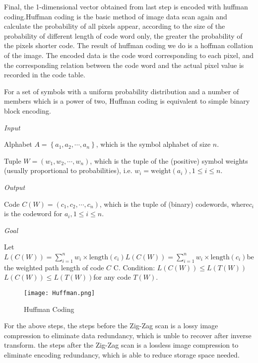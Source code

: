 \documentclass{mcmthesis}
\begin{document}
Final, the 1-dimensional vector obtained from last step is encoded with huffman coding.Huffman coding is the basic method of image data scan again and calculate the probability of all pixels appear, according to the size of the probability of different length of code word only, the greater the probability of the pixels shorter code. The result of huffman coding we do is a hoffman collation of the image. The encoded data is the code word corresponding to each pixel, and the corresponding relation between the code word and the actual pixel value is recorded in the code table.

For a set of symbols with a uniform probability distribution and a number of members which is a power of two, Huffman coding is equivalent to simple binary block encoding.

\emph{Input}

Alphabet  ${\displaystyle A=\left\{a_{1},a_{2},\cdots ,a_{n}\right\}}$, which is the symbol alphabet of size ${\displaystyle n}$.

Tuple ${\displaystyle W=(w_{1},w_{2},\cdots ,w_{n})}$, which is the tuple of the (positive) symbol weights (usually proportional to probabilities), i.e. ${\displaystyle w_{i}=\mathrm {weight} \left(a_{i}\right),1\leq i\leq n}$.

\emph{Output}

Code ${\displaystyle C\left(W\right)=(c_{1},c_{2},\cdots ,c_{n})}$, which is the tuple of (binary) codewords, where$ {\displaystyle c_{i}}$ is the codeword for ${\displaystyle a_{i},1\leq i\leq n}$.

\emph{Goal}

Let ${\displaystyle L\left(C\left(W\right)\right)=\sum _{i=1}^{n}{w_{i}\times \mathrm {length} \left(c_{i}\right)}} {\displaystyle L\left(C\left(W\right)\right)=\sum _{i=1}^{n}{w_{i}\times \mathrm {length} \left(c_{i}\right)}} $be the weighted path length of code ${\displaystyle C}$ C. Condition: ${\displaystyle L\left(C\left(W\right)\right)\leq L\left(T\left(W\right)\right)}$ ${\displaystyle L\left(C\left(W\right)\right)\leq L\left(T\left(W\right)\right)} $for any code ${\displaystyle T\left(W\right)}$.
\begin{figure}[h]
\centering
\texttt{[image: Huffman.png]}
\caption{Huffman Coding} \label{fig:Huffman Coding}
\end{figure}

For the above steps, the steps before the Zig-Zag scan is a lossy image compression to eliminate data redundancy, which is unble to recover after inverse transform. the steps after the Zig-Zag scan is a lossless image compression to eliminate encoding redundancy, which is able to reduce storage space needed.
\end{document}
